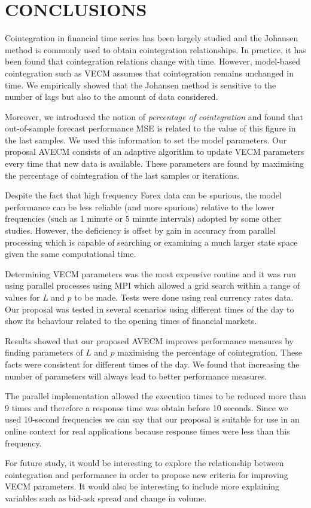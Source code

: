 \section{\uppercase{Conclusions}}
\label{sec:conclusions}
Cointegration in financial time series has been largely studied and the 
Johansen method is commonly used to obtain cointegration relationships. 
In practice, it has been found that cointegration relations change with time. 
However, model-based cointegration such as VECM assumes that cointegration
remains unchanged in time. 
We empirically showed that the Johansen method is sensitive to the number
of lags but also to the amount of data considered.

Moreover, we introduced the notion of {\em percentage of cointegration\/} and
found that out-of-sample forecast performance MSE is related to the value of
this figure in the last samples.  We used this information to set the model
parameters.  Our proposal AVECM consists of an adaptive algorithm to update VECM
parameters every time that new data is available. These parameters are found by
maximising the percentage of cointegration of the last samples or iterations.

Despite the fact that high frequency Forex data can be spurious, the model performance can be less reliable (and more spurious) relative to the lower frequencies (such as 1 minute or 5 minute intervals) adopted by some other studies. However, the deficiency is offset by gain in accuracy from parallel processing which is capable of searching or examining a much larger state space given the same computational time.

Determining VECM parameters was the most expensive routine and it was run
using parallel processes using MPI which allowed a grid search within a range of
values for $L$ and $p$ to be made.
Tests were done using real currency rates data. 
Our proposal was tested in several scenarios using different times of
the day to show its behaviour related to the opening times of
financial markets.

Results showed that our proposed AVECM improves performance measures by finding
parameters of $L$ and $p$ maximising the percentage of cointegration.
These facts were consistent for different times of the day. 
We found that increasing the number of parameters will always lead to
better performance measures.

The parallel implementation allowed the execution times to be reduced
more than 9 times and therefore a response time was obtain before 10
seconds. Since we used 10-second frequencies we can say that our proposal is suitable
for use in an online context for real applications because response times
were less than this frequency.

For future study, it would be interesting to explore the relationship between
cointegration and performance in order to propose new criteria for
improving VECM parameters. It would also be interesting to include more 
explaining variables such as bid-ask spread and change in volume.

